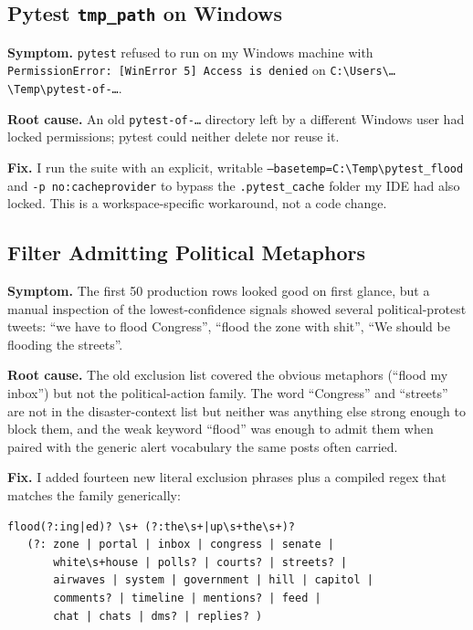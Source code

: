 \documentclass[11pt]{article}
\begin{document}
\subsection{Pytest \texttt{tmp\_path} on Windows}

\textbf{Symptom.} \texttt{pytest} refused to run on my Windows machine
with \texttt{PermissionError: [WinError 5] Access is denied} on
\texttt{C:\textbackslash{}Users\textbackslash{}\ldots\textbackslash{}Temp\textbackslash{}pytest-of-\ldots}.

\textbf{Root cause.} An old \texttt{pytest-of-\ldots} directory left by
a different Windows user had locked permissions; pytest could neither
delete nor reuse it.

\textbf{Fix.} I run the suite with an explicit, writable
\texttt{--basetemp=C:\textbackslash{}Temp\textbackslash{}pytest\_flood}
and \texttt{-p no:cacheprovider} to bypass the \texttt{.pytest\_cache}
folder my IDE had also locked. This is a workspace-specific
workaround, not a code change.

\subsection{Filter Admitting Political Metaphors}

\textbf{Symptom.} The first 50 production rows looked good on first
glance, but a manual inspection of the lowest-confidence signals showed
several political-protest tweets: ``we have to flood Congress'', ``flood
the zone with shit'', ``We should be flooding the streets''.

\textbf{Root cause.} The old exclusion list covered the obvious
metaphors (``flood my inbox'') but not the political-action family. The
word ``Congress'' and ``streets'' are not in the disaster-context list
but neither was anything else strong enough to block them, and the
weak keyword ``flood'' was enough to admit them when paired with the
generic alert vocabulary the same posts often carried.

\textbf{Fix.} I added fourteen new literal exclusion phrases plus a
compiled regex that matches the family generically:

\begin{lstlisting}
flood(?:ing|ed)? \s+ (?:the\s+|up\s+the\s+)?
   (?: zone | portal | inbox | congress | senate |
       white\s+house | polls? | courts? | streets? |
       airwaves | system | government | hill | capitol |
       comments? | timeline | mentions? | feed |
       chat | chats | dms? | replies? )
\end{lstlisting}
\end{document}
